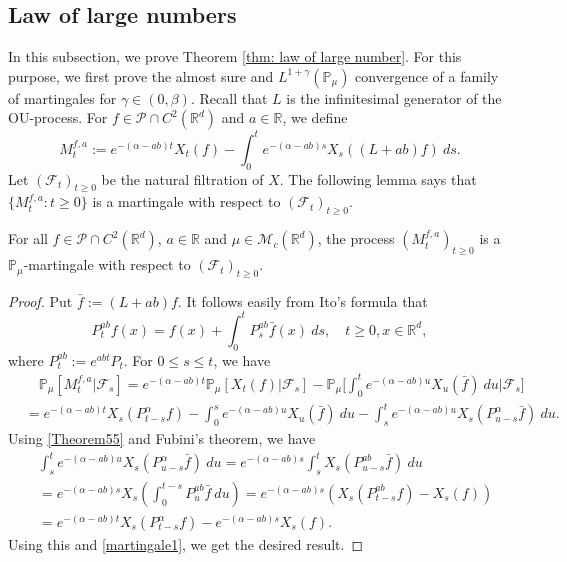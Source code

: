 \documentclass[EJP]{ejpecp} %
\begin{document}
\subsection{Law of large numbers}
\label{sec: large rate lln}
	In this subsection, we prove Theorem \ref{thm: law of large number}.
	For this purpose, we first prove the almost sure and $L^{1+\gamma}(\mathbb{P}_{\mu})$ convergence of a family of martingales for $\gamma\in (0, \beta)$. Recall that $L$ is the infinitesimal generator of the OU-process.  For $f\in \mathcal{P}\cap C^2(\mathbb R^d)$ and  $a\in \mathbb R$, we define
\begin{equation}
\label{defmartingale}
  	M_t^{f,a}
   	:=e^{-(\alpha-ab)t}X_t(f)-\int_0^t e^{-(\alpha-ab)s} X_s((L+ab)f)~ ds.
\end{equation}
	Let $(\mathscr{F}_t)_{t\geq 0}$ be the natural filtration of $X$.  The following lemma says that $\{M_t^{f,a}: t\geq 0\}$ is a martingale with respect to $(\mathscr{F}_t)_{t\geq 0}$.

\begin{lemma}
\label{lemma25}
  	For all $f\in \mathcal{P}\cap C^2(\mathbb R^d)$, $a\in \mathbb R$ and $\mu\in \mathcal M_c(\mathbb R^d)$, the process $(M_t^{f,a})_{t\geq 0}$ is a $\mathbb P_\mu$-martingale with respect to $(\mathscr F_t)_{t\geq 0}$.
\end{lemma}

\begin{proof}
  	Put $\bar{f} :=(L+ab)f$.
  	It follows easily from Ito's formula that
\begin{equation}
    \label{Theorem55}
    P_t^{ab}f(x)
    = f(x)+\int_0^t P_s^{ab}\bar{f}(x)~ds,\quad t\geq 0,x\in \mathbb R^d,
\end{equation}
	where $P_t^{ab} := e^{abt}P_t$.
	For $0\leq s\leq t$, we have
\begin{align}
\label{martingale1}
    & \quad\mathbb{P}_{\mu}[M_t^{f,a}|\mathscr{F}_s]
    =e^{-(\alpha-ab)t}\mathbb{P}_{\mu}\left[X_t(f)|\mathscr{F}_s\right]-\mathbb{P}_{\mu}\Big[\int_0^t e^{-(\alpha-ab)u}X_u(\bar{f})~ du\Big|\mathscr{F}_s\big] \\
    & =e^{-(\alpha-ab)t} X_s(P_{t-s}^{\alpha}f)-\int_0^s e^{-(\alpha-ab)u} X_u(\bar{f})~ du - \int_s^t e^{-(\alpha-ab)u}X_s(P_{u-s}^{\alpha} \bar{f})~ du.
\end{align}
  	Using \eqref{Theorem55} and Fubini's theorem, we have
\begin{align}
    & \int_s^t e^{-(\alpha-ab)u}X_s(P_{u-s}^{\alpha} \bar{f})~ du=e^{-(\alpha-ab)s}\int_s^tX_s(P_{u-s}^{ab}\bar{f})~du\\
    & = e^{ - ( \alpha - ab ) s } X_s\left( \int_0^{t-s} P_{u}^{ab} \bar{f}~ du\right)
    = e^{-(\alpha-ab)s}\left(X_s(P_{t-s}^{ab}f) - X_s(f) \right) \\
    & = e^{-(\alpha-ab)t} X_s( P_{t-s}^{\alpha}f) - e^{ - ( \alpha - ab ) s} X_s(f).
\end{align}
	Using this and \eqref{martingale1}, we get the desired result.
\end{proof}
\end{document}
